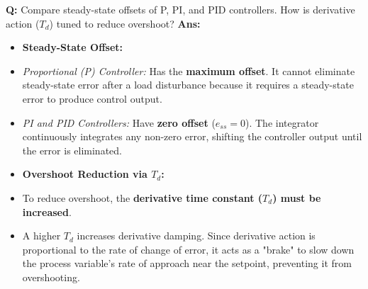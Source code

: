 \documentclass[10pt,a4paper,twocolumn]{article}
\begin{document}
\begin{tcolorbox}[
  colback=white,
  colframe=UnitColorTwo,
  colbacktitle=gray!10!white,
  coltitle=black,
  fonttitle=\bfseries\sffamily\small,
  title={Unit II $\bullet$ Card 15: Steady-State Offset \& Derivative Damping (Q2.6)},
  boxrule=1.2pt,
  arc=2mm,
  outer arc=2mm,
  boxsep=1.5mm,
  top=1mm,
  bottom=1mm,
  left=1.5mm,
  right=1.5mm,
  before skip=2.5mm,
  after skip=2.5mm
]
\textbf{Q:} Compare steady-state offsets of P, PI, and PID controllers. How is derivative action ($T_d$) tuned to reduce overshoot?
\tcbline
\textbf{Ans:} \begin{itemize}
  \item   \textbf{Steady-State Offset:}
  \item   \textit{Proportional (P) Controller:} Has the \textbf{maximum offset}. It cannot eliminate steady-state error after a load disturbance because it requires a steady-state error to produce control output.
  \item   \textit{PI and PID Controllers:} Have \textbf{zero offset} ($e_{ss} = 0$). The integrator continuously integrates any non-zero error, shifting the controller output until the error is eliminated.
  \item   \textbf{Overshoot Reduction via $T_d$:}
  \item   To reduce overshoot, the \textbf{derivative time constant ($T_d$) must be increased}.
  \item   A higher $T_d$ increases derivative damping. Since derivative action is proportional to the rate of change of error, it acts as a "brake" to slow down the process variable's rate of approach near the setpoint, preventing it from overshooting.
\end{itemize}
\end{tcolorbox}
\end{document}
